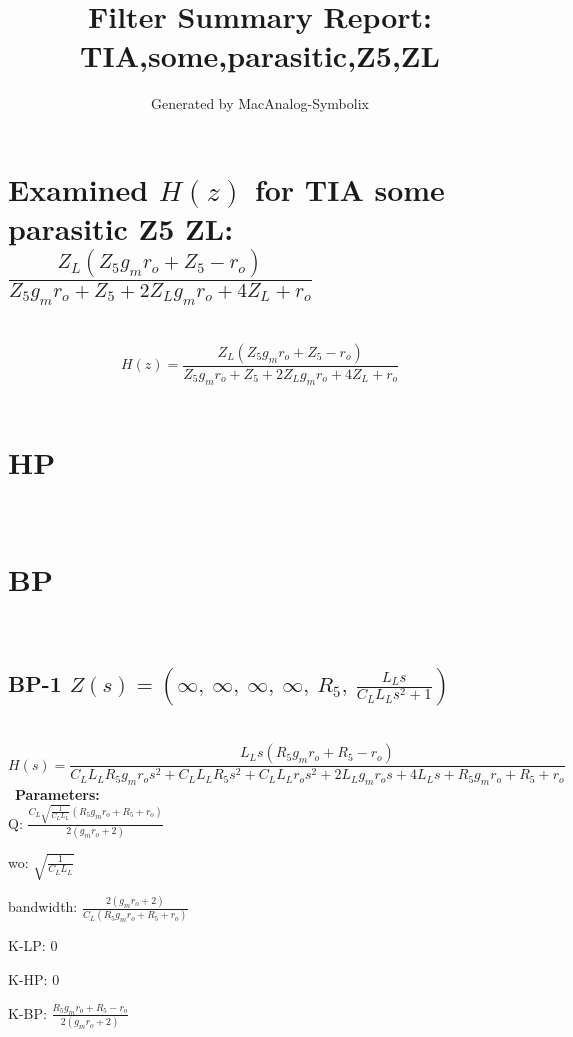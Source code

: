 \documentclass{article}
\begin{document}
        
                        \title{Filter Summary Report: TIA,some,parasitic,Z5,ZL}
                        \author{Generated by MacAnalog-Symbolix}
                        \maketitle

                        \tableofcontents
                        \newpage
                        \section{Examined $H(z)$ for TIA some parasitic Z5 ZL: $\frac{Z_{L} \left(Z_{5} g_{m} r_{o} + Z_{5} - r_{o}\right)}{Z_{5} g_{m} r_{o} + Z_{5} + 2 Z_{L} g_{m} r_{o} + 4 Z_{L} + r_{o}}$ }\ 
\textbf{\[H(z) = \frac{Z_{L} \left(Z_{5} g_{m} r_{o} + Z_{5} - r_{o}\right)}{Z_{5} g_{m} r_{o} + Z_{5} + 2 Z_{L} g_{m} r_{o} + 4 Z_{L} + r_{o}}\] }\ 
\section{HP}\ 
\section{BP}\ 
\subsection{BP-1 $Z(s) = \left( \infty, \  \infty, \  \infty, \  \infty, \  R_{5}, \  \frac{L_{L} s}{C_{L} L_{L} s^{2} + 1}\right)$ } \ 
\textbf{\[H(s) = \frac{L_{L} s \left(R_{5} g_{m} r_{o} + R_{5} - r_{o}\right)}{C_{L} L_{L} R_{5} g_{m} r_{o} s^{2} + C_{L} L_{L} R_{5} s^{2} + C_{L} L_{L} r_{o} s^{2} + 2 L_{L} g_{m} r_{o} s + 4 L_{L} s + R_{5} g_{m} r_{o} + R_{5} + r_{o}}\] } \ 
\textbf{Parameters:}\\ 

Q: $\frac{C_{L} \sqrt{\frac{1}{C_{L} L_{L}}} \left(R_{5} g_{m} r_{o} + R_{5} + r_{o}\right)}{2 \left(g_{m} r_{o} + 2\right)}$\ 

wo: $\sqrt{\frac{1}{C_{L} L_{L}}}$\ 

bandwidth: $\frac{2 \left(g_{m} r_{o} + 2\right)}{C_{L} \left(R_{5} g_{m} r_{o} + R_{5} + r_{o}\right)}$\ 

K-LP: $0$\ 

K-HP: $0$\ 

K-BP: $\frac{R_{5} g_{m} r_{o} + R_{5} - r_{o}}{2 \left(g_{m} r_{o} + 2\right)}$\ 
\end{document}
